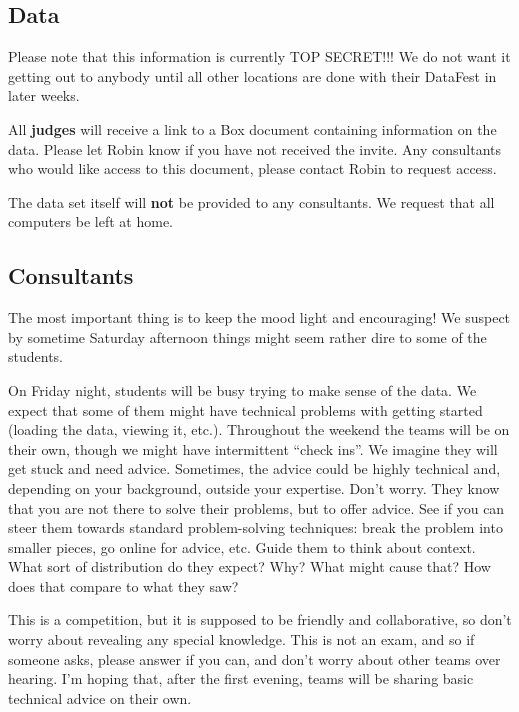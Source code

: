 \documentclass[]{article}
\begin{document}
\hypertarget{data}{%
\subsection{Data}\label{data}}

{Please note that this information is currently TOP SECRET!!!} We do not
want it getting out to anybody until all other locations are done with
their DataFest in later weeks.

All \textbf{judges} will receive a link to a Box document containing
information on the data. Please let Robin know if you have not received
the invite. Any consultants who would like access to this document,
please contact Robin to request access.

The data set itself will \textbf{not} be provided to any consultants.
{We request that all computers be left at home.}

\hypertarget{consultants}{%
\subsection{Consultants}\label{consultants}}

The most important thing is to keep the mood light and encouraging! We
suspect by sometime Saturday afternoon things might seem rather dire to
some of the students.

On Friday night, students will be busy trying to make sense of the data.
We expect that some of them might have technical problems with getting
started (loading the data, viewing it, etc.). Throughout the weekend the
teams will be on their own, though we might have intermittent ``check
ins''. We imagine they will get stuck and need advice. Sometimes, the
advice could be highly technical and, depending on your background,
outside your expertise. Don't worry. They know that you are not there to
solve their problems, but to offer advice. See if you can steer them
towards standard problem-solving techniques: break the problem into
smaller pieces, go online for advice, etc. Guide them to think about
context. What sort of distribution do they expect? Why? What might cause
that? How does that compare to what they saw?

This is a competition, but it is supposed to be friendly and
collaborative, so don't worry about revealing any special knowledge.
This is not an exam, and so if someone asks, please answer if you can,
and don't worry about other teams over hearing. I'm hoping that, after
the first evening, teams will be sharing basic technical advice on their
own.
\end{document}
